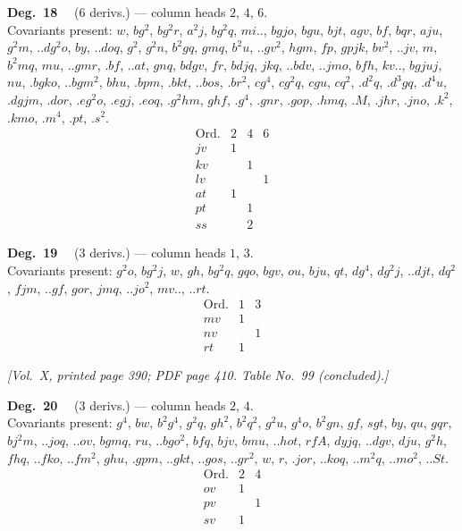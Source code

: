 \documentclass[11pt]{article}
\begin{document}
\bigskip

\noindent\textbf{Deg.~18} \ \ (6 derivs.) --- column heads $2$, $4$, $6$. \\
Covariants present: $w$, $bg^{2}$, $bg^{2}r$, $a^{2}j$, $bg^{2}q$, $mi..$, $bgjo$, $bgu$, $bjt$, $agv$, $bf$, $bqr$, $aju$, $g^{2}m$, $..dg^{2}o$, $by$, $..doq$, $g^{2}$, $g^{2}n$, $b^{2}gq$, $gmq$, $b^{2}u$, $..gv^{2}$, $hgm$, $fp$, $gpjk$, $bv^{2}$, $..jv$, $m$, $b^{2}mq$, $mu$, $..gmr$, $.bf$, $..at$, $gnq$, $bdgv$, $fr$, $bdjq$, $jkq$, $..bdv$, $..jmo$, $bfh$, $kv..$, $bgjuj$, $nu$, $.bgko$, $..bgm^{2}$, $bhu$, $.bpm$, $.bkt$, $..bos$, $.br^{2}$, $cg^{4}$, $cg^{2}q$, $cgu$, $cq^{2}$, $.d^{2}q$, $.d^{3}gq$, $.d^{4}u$, $.dgjm$, $.dor$, $.eg^{2}o$, $.egj$, $.eoq$, $.g^{2}hm$, $ghf$, $.g^{4}$, $.gnr$, $.gop$, $.hmq$, $.M$, $.jhr$, $.jno$, $.k^{2}$, $.kmo$, $.m^{4}$, $.pt$, $.s^{2}$.
\[
\begin{array}{l|ccc}
\text{Ord.} & 2 & 4 & 6 \\\hline
jv & 1 & & \\
kv & & 1 & \\
lv & & & 1 \\
at & 1 & & \\
pt & & 1 & \\
ss & & 2 &
\end{array}
\]

\bigskip

\noindent\textbf{Deg.~19} \ \ (3 derivs.) --- column heads $1$, $3$. \\
Covariants present: $g^{2}o$, $bg^{2}j$, $w$, $gh$, $bg^{2}q$, $gqo$, $bgv$, $ou$, $bju$, $qt$, $dg^{4}$, $dg^{2}j$, $..djt$, $dq^{2}$, $fjm$, $..gf$, $gor$, $jmq$, $..jo^{2}$, $mv..$, $..rt$.
\[
\begin{array}{l|cc}
\text{Ord.} & 1 & 3 \\\hline
mv & 1 & \\
nv & & 1 \\
rt & 1 &
\end{array}
\]

\newpage

\noindent\textit{[Vol.~X, printed page 390; PDF page 410. Table No.~99 (concluded).]}

\bigskip

\noindent\textbf{Deg.~20} \ \ (3 derivs.) --- column heads $2$, $4$. \\
Covariants present: $g^{4}$, $bw$, $b^{2}g^{4}$, $g^{2}q$, $gh^{2}$, $b^{2}q^{2}$, $g^{2}u$, $g^{4}o$, $b^{2}gn$, $gf$, $sgt$, $by$, $qu$, $gqr$, $bj^{2}m$, $..joq$, $..ov$, $bgmq$, $ru$, $..bgo^{2}$, $bfq$, $bjv$, $bmu$, $..hot$, $rfA$, $dyjq$, $..dgv$, $dju$, $g^{2}h$, $fhq$, $..fko$, $..fm^{2}$, $ghu$, $.gpm$, $..gkt$, $..gos$, $..gr^{2}$, $w$, $r$, $.jor$, $..koq$, $..m^{2}q$, $..mo^{2}$, $..St$.
\[
\begin{array}{l|cc}
\text{Ord.} & 2 & 4 \\\hline
ov & 1 & \\
pv & & 1 \\
sv & 1 &
\end{array}
\]
\end{document}
